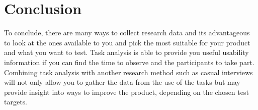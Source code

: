 \documentclass{scrartcl}
\begin{document}
	\section{Conclusion}
		To conclude, there are many ways to collect research data and its advantageous to look at the ones available to you and pick the most suitable for your product and what you want to test. Task analysis is able to provide you useful usability information if you can find the time to observe and the participants to take part. Combining task analysis with another research method such as casual interviews will not only allow you to gather the data from the use of the tasks but may provide insight into ways to improve the product, depending on the chosen test targets.

	
	
	
	
\end{document}
